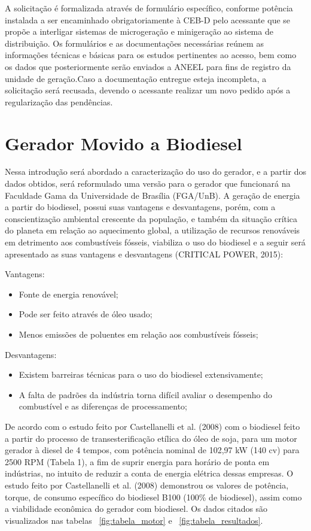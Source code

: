 A solicitação é formalizada através de formulário específico, conforme potência instalada  a ser encaminhado obrigatoriamente à CEB-D pelo acessante que se propõe a interligar sistemas de microgeração e minigeração ao sistema de distribuição. Os formulários e as documentações necessárias reúnem as informações técnicas e básicas para os estudos pertinentes ao acesso, bem como os dados que posteriormente serão enviados a ANEEL para fins de registro da unidade de geração.Caso a documentação entregue esteja incompleta, a solicitação será recusada, devendo o acessante realizar um novo pedido após a regularização das pendências. 

\section{Gerador Movido a Biodiesel}

Nessa introdução será abordado a caracterização do uso do gerador, e a partir dos dados obtidos, será reformulado uma versão para o gerador que funcionará na Faculdade Gama da Universidade de Brasília (FGA/UnB).
A geração de energia a partir do biodiesel, possui suas vantagens e desvantagens, porém, com a conscientização ambiental crescente da população, e também da situação crítica do planeta em relação ao aquecimento global, a utilização de recursos renováveis em detrimento aos combustíveis fósseis, viabiliza o uso do biodiesel e a seguir será apresentado as suas vantagens e desvantagens (CRITICAL POWER, 2015):

Vantagens:
\begin{itemize}
  \item Fonte de energia renovável;
  \item Pode ser feito através de óleo usado;
  \item Menos emissões de poluentes em relação aos combustíveis fósseis;
\end{itemize}

Desvantagens:
\begin{itemize}
  \item Existem barreiras técnicas para o uso do biodiesel extensivamente;
  \item A falta de padrões da indústria torna difícil avaliar o desempenho do combustível e as diferenças de processamento;
\end{itemize}

De acordo com o estudo feito por Castellanelli et al. (2008) com o biodiesel feito a partir do processo de transesterificação etílica do óleo de soja, para um motor gerador à diesel de 4 tempos, com potência nominal de 102,97 kW (140 cv) para 2500 RPM (Tabela 1), a fim de suprir energia para horário de ponta em indústrias, no intuito de reduzir a conta de energia elétrica dessas empresas.
O estudo feito por Castellanelli et al. (2008) demonstrou os valores de potência, torque, de consumo específico do biodiesel B100 (100\% de biodiesel), assim como a viabilidade econômica do gerador com biodiesel. Os dados citados são visualizados nas tabelas ~\ref{fig:tabela_motor} e ~\ref{fig:tabela_resultados}.

